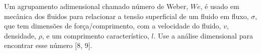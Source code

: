 Um agrupamento adimensional chamado número de Weber, $We$, é usado em mecânica dos fluidos para relacionar a tensão superficial de um fluido em fluxo, $\sigma$, que tem dimensões de força/comprimento, com a velocidade do fluido, $v$, densidade, $\rho$, e um comprimento característico, $l$. Use a análise dimensional para encontrar esse número [8, 9].

